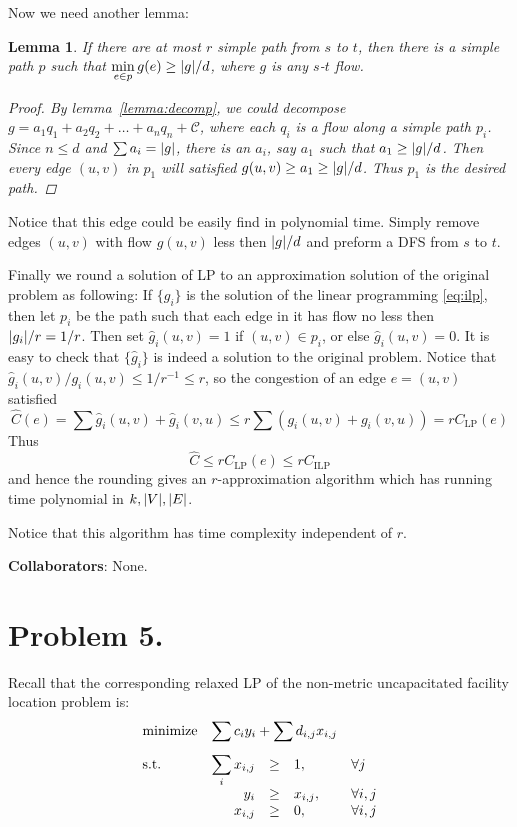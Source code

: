 \documentclass[12pt, a4paper]{article}
\DeclarePairedDelimiter{\abs}{\lvert}{\rvert}
\newtheorem{lemma}{Lemma}
\begin{document}
Now we need another lemma:
\begin{lemma}
  If there are at most $r$ simple path from $s$ to $t$, then there is a simple path $p$
  such that $\min\limits_{e \in p} g(e) \geq \abs{g} / d$, where $g$ is any $s$-$t$ flow.

  \begin{proof}
    By lemma~\ref{lemma:decomp}, we could decompose $g = a_1 q_1 + a_2 q_2 + \dots + a_n q_n + \mathcal{C}$,
    where each $q_i$ is a flow along a simple path $p_i$. Since $n \leq d$ and $\sum a_i = \abs{g}$,
    there is an $a_i$, say $a_1$ such that $a_1 \geq \abs{g} / d$.
    Then every edge $(u, v)$ in $p_1$ will satisfied $g(u, v) \geq a_1 \geq \abs{g} / d$. Thus $p_1$
    is the desired path.
  \end{proof}
\end{lemma}
Notice that this edge could be easily find in polynomial time. Simply remove edges $(u, v)$ with
flow $g(u, v)$ less then $\abs{g}/d$ and preform a DFS from $s$ to $t$.

Finally we round a solution of LP to an approximation solution of the original problem as following:
If $\{g_i\}$ is the solution of the linear programming \eqref{eq:ilp}, then let $p_i$ be the path
such that each edge in it has flow no less then $\abs{g_i} / r = 1 / r$. Then set $\hat{g}_i(u, v) = 1$
if $(u, v) \in p_i$, or else $\hat{g}_i(u, v) = 0$. It is easy to check that $\{\hat{g}_i\}$ is
indeed a solution to the original problem. Notice that $\hat{g}_i(u, v) / g_i(u, v) \leq 1 / r^{-1} \leq r$,
so the congestion of an edge $e = (u, v)$ satisfied
\[ \hat{C}(e) = \sum \hat{g}_i(u, v) + \hat{g}_i(v, u) \leq r \sum \left( g_i(u, v) + g_i(v, u) \right) = rC_{\text{LP}}(e) \]
Thus
\[ \hat{C} \leq r C_{\text{LP}}(e) \leq r C_{\text{ILP}} \]
and hence the rounding gives an $r$-approximation algorithm which has running time polynomial in $k, \abs{V}, \abs{E}$.

Notice that this algorithm has time complexity independent of $r$.

{\bf Collaborators}: None.

\section{Problem 5.}

Recall that the corresponding relaxed LP of the non-metric uncapacitated facility location problem is:
\begin{equation} \label{eq:lp}
  \begin{array}{>{\displaystyle}l>{\displaystyle}r>{\displaystyle}c*2{>{\displaystyle}l}}
    \text{minimize} & \multicolumn{3}{l}{\displaystyle \sum c_i y_i + \sum d_{i,j} x_{i,j}} \\[10pt]
    \text{s.t.} & \sum_i x_{i, j} & \geq & 1, & \forall j \\
    & y_i & \geq & x_{i, j}, & \forall i, j \\
    & x_{i, j} & \geq & 0, & \forall i, j
  \end{array}
\end{equation}
\end{document}
